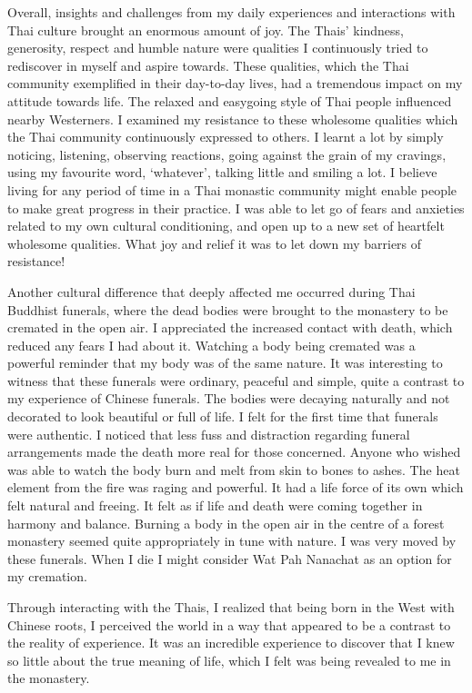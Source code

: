 Overall, insights and challenges from my daily experiences and
interactions with Thai culture brought an enormous amount of joy. The
Thais' kindness, generosity, respect and humble nature were qualities I
continuously tried to rediscover in myself and aspire towards. These
qualities, which the Thai community exemplified in their day-to-day
lives, had a tremendous impact on my attitude towards life. The relaxed
and easygoing style of Thai people influenced nearby Westerners. I
examined my resistance to these wholesome qualities which the Thai
community continuously expressed to others. I learnt a lot by simply
noticing, listening, observing reactions, going against the grain of my
cravings, using my favourite word, `whatever', talking little and
smiling a lot. I believe living for any period of time in a Thai
monastic community might enable people to make great progress in their
practice. I was able to let go of fears and anxieties related to my own
cultural conditioning, and open up to a new set of heartfelt wholesome
qualities. What joy and relief it was to let down my barriers of
resistance! 

Another cultural difference that deeply affected me occurred during Thai
Buddhist funerals, where the dead bodies were brought to the monastery
to be cremated in the open air. I appreciated the increased contact with
death, which reduced any fears I had about it. Watching a body being
cremated was a powerful reminder that my body was of the same nature. It
was interesting to witness that these funerals were ordinary, peaceful
and simple, quite a contrast to my experience of Chinese funerals. The
bodies were decaying naturally and not decorated to look beautiful or
full of life. I felt for the first time that funerals were authentic. I
noticed that less fuss and distraction regarding funeral arrangements
made the death more real for those concerned. Anyone who wished was able
to watch the body burn and melt from skin to bones to ashes. The heat
element from the fire was raging and powerful. It had a life force of
its own which felt natural and freeing. It felt as if life and death
were coming together in harmony and balance. Burning a body in the open
air in the centre of a forest monastery seemed quite appropriately in
tune with nature. I was very moved by these funerals. When I die I might
consider Wat Pah Nanachat as an option for my cremation. 

Through interacting with the Thais, I realized that being born in the
West with Chinese roots, I perceived the world in a way that appeared to
be a contrast to the reality of experience. It was an incredible
experience to discover that I knew so little about the true meaning of
life, which I felt was being revealed to me in the monastery. 

